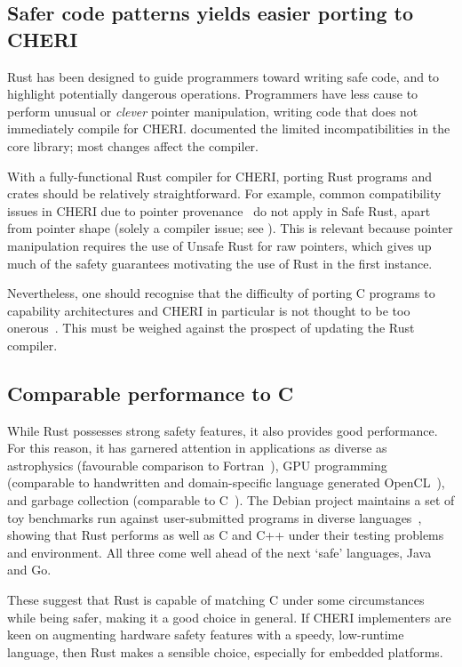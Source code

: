\documentclass[dissertation.tex]{subfiles}
\begin{document}
\subsection{Safer code patterns yields easier porting to CHERI}
\label{sec:eval-cheri-port}

Rust has been designed to guide programmers toward writing safe code,
and to highlight potentially dangerous operations.
Programmers have less cause to perform unusual or \emph{clever} pointer
manipulation, writing code that does not immediately compile for CHERI.
 documented the limited incompatibilities in the core
library; most changes affect the compiler.

With a fully-functional Rust compiler for CHERI, porting Rust programs
and crates should be relatively straightforward.
For example, common compatibility issues in CHERI due to pointer
provenance~\cite{cheri-2019-abstract} do not apply in Safe Rust,
apart from pointer shape (solely a compiler issue; see
).
This is relevant because pointer manipulation requires the use of Unsafe
Rust for raw pointers, which gives up much of the safety guarantees
motivating the use of Rust in the first instance.

Nevertheless, one should recognise that the difficulty of porting C
programs to capability architectures and CHERI in particular is not
thought to be too onerous~\cite{capsicum-usability}.
This must be weighed against the prospect of updating the Rust compiler.


\subsection{Comparable performance to C}
\label{eval:cheri-perf}

While Rust possesses strong safety features, it also provides good
performance.
For this reason, it has garnered attention in applications as diverse as
astrophysics (favourable comparison to Fortran~\cite{blanco-astro}), GPU
programming (comparable to handwritten and domain-specific language
generated OpenCL~\cite{holk-gpu}), and garbage collection (comparable to
C~\cite{lin-gc}).
The Debian project maintains a set of toy benchmarks run against
user-submitted programs in diverse
languages~\cite{debian-benchmarksgame}, showing that Rust performs as
well as C and C++ under their testing problems and environment.
All three come well ahead of the next `safe' languages, Java and Go.

These suggest that Rust is capable of matching C under some
circumstances while being safer, making it a good choice in general.
If CHERI implementers are keen on augmenting hardware safety features
with a speedy, low-runtime language, then Rust makes a sensible choice,
especially for embedded platforms.
\end{document}
